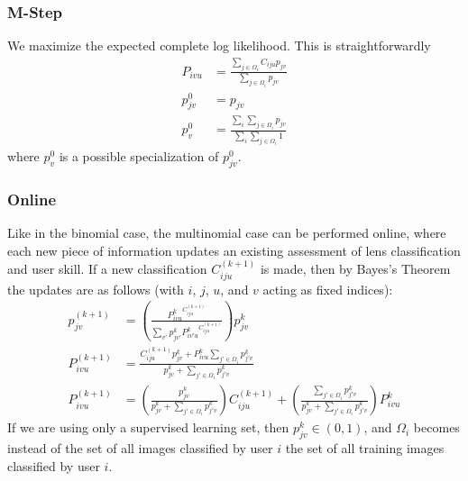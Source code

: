 \documentclass[useAMS,usenatbib,a4paper]{mn2e}
\begin{document}
\subsubsection{M-Step}

We maximize the expected complete log likelihood. This is straightforwardly
\begin{align}
  P_{ivu} &= \frac{\sum_{j \in \Omega_i} C_{iju} p_{jv}}{\sum_{j \in
\Omega_i} p_{jv}} \\
  p_{jv}^0 &= p_{jv} \\
  p_{v}^0 &= \frac{\sum_i \sum_{j \in \Omega_i} p_{jv}}{\sum_i \sum_{j \in
\Omega_i} 1}
\end{align}
where $p_{v}^0$ is a possible specialization of $p_{jv}^0$.

\subsubsection{Online}

Like in the binomial case, the multinomial case can be performed online, where
each new piece of information updates an existing assessment of lens
classification and user skill. If a new classification $C_{iju}^{(k + 1)}$ is
made, then by Bayes's Theorem the updates are as follows (with $i$, $j$, $u$,
and $v$ acting as fixed indices):
\begin{align}
  p_{jv}^{(k + 1)} &= \left( \frac{P^{k}_{ivu}^{C_{iju}^{(k + 1)}}}{\sum_{v'}
  p_{jv'}^{k} P^{k}_{iv'u}^{C_{iju}^{(k+1)}}} \right) p_{jv}^{k} \\
  P^{(k+1)}_{ivu}  &= \frac{C^{(k+1)}_{iju} p^{k}_{jv} + P^{k}_{ivu} \sum_{j'\in
  \Omega_i} p^{k}_{j'v} }{p^{k}_{jv} + \sum_{j'
  \in \Omega_i} p^{k}_{j'v}} \\
  P^{(k+1)}_{ivu}  &= \left( \frac{p^{k}_{jv}}{p^{k}_{jv} + \sum_{j'
  \in \Omega_i} p^{k}_{j'v}} \right) C^{(k+1)}_{iju} +
  \left( \frac{\sum_{j'\in \Omega_i} p^{k}_{j'v}}
    {p^{k}_{jv} + \sum_{j'\in \Omega_i} p^{k}_{j'v}}
 \right) P^{k}_{ivu} \end{align}
If we are using only a supervised learning set, then $p^k_{jv} \in (0, 1)$, and
$\Omega_i$ becomes instead of the set of all images classified by user $i$ the
set of all training images classified by user $i$.
\end{document}
